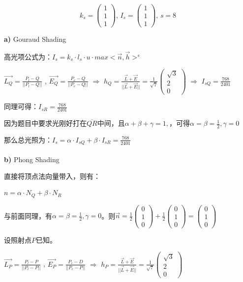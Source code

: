 \documentclass[fleqn]{article}
\begin{document}
$$k_s=\begin{pmatrix}
    1\\1\\1
\end{pmatrix},\,I_s=\begin{pmatrix}
    1\\1\\1
\end{pmatrix},\,s=8$$

\noindent\textbf{a)} Gouraud Shading

高光项公式为：$I_{s}=k_s \cdot l_s \cdot u \cdot max<\vec{n},\vec{h}>^s$


$\overrightarrow{L_Q}=\frac{P_l-Q}{||P_l-Q||}$
, $\overrightarrow{E_Q}=\frac{P_e-Q}{||P_e-Q||}$
$\Rightarrow$ $h_Q = \frac{\overrightarrow{L}+\overrightarrow{E}}{||\overrightarrow{L}+\overrightarrow{E}||}=\frac{1}{\sqrt{7}}\begin{pmatrix}
    \sqrt{3}\\2\\0
\end{pmatrix}$
$\Rightarrow$
$I_{sQ}=\frac{768}{2401}$

同理可得：$I_{sR}=\frac{768}{2401}$

因为题目中要求光刚好打在$\overline{QR}$中间，且$\alpha + \beta +\gamma = 1,$，可得$\alpha = \beta = \frac{1}{2},\gamma = 0$

那么总光照为：$I_s=\alpha\cdot I_{sQ} + \beta\cdot I_{sR}=\frac{768}{2401}$
\\
\\
\noindent\textbf{b)} Phong Shading

直接将顶点法向量带入，则有：

$n=\alpha\cdot N_Q + \beta\cdot N_R$

与前面同理，有$\alpha = \beta = \frac{1}{2},\gamma = 0$。则$\vec{n}=\frac{1}{2}\begin{pmatrix}
    0\\1\\0
\end{pmatrix}+\frac{1}{2}\begin{pmatrix}
    0\\1\\0
\end{pmatrix}=\begin{pmatrix}
    0\\1\\0
\end{pmatrix}$

设照射点$P$已知。

$\overrightarrow{L_P}=\frac{P_l-P}{||P_l-P||}$
, $\overrightarrow{E_P}=\frac{P_e-D}{||P_e-P||}$
$\Rightarrow$ $h_P = \frac{\overrightarrow{L}+\overrightarrow{E}}{||\overrightarrow{L}+\overrightarrow{E}||}=\frac{1}{\sqrt{7}}\begin{pmatrix}
    \sqrt{3}\\2\\0
\end{pmatrix}$
\end{document}
